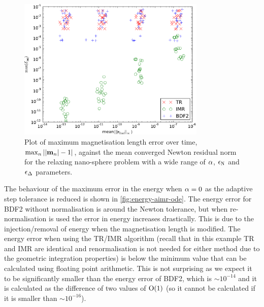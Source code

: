\begin{figure}
  \centering
  \includegraphics[width=0.8\textwidth]{plots/aimr_ode_llg_ml_sweep/maxofmlengtherrormaxesvsmeanminofnewtonresiduals.pdf}
  \caption{Plot of maximum magnetisation length error over time, $\max_n \left|{\left|{\boldsymbol{\mathrm{m}}_n} \right| -1} \right|$, against the mean converged Newton residual norm for the relaxing nano-sphere problem with a wide range of $\alpha$, $\epsilon_{\mathrm{N}}$ and $\epsilon_{\Delta_{}}$ parameters.}
  \label{fig:ml-aimr-newton}
\end{figure}

The behaviour of the maximum error in the energy when $\alpha = 0$ as the adaptive step tolerance is reduced is shown in \cref{fig:energy-aimr-ode}.
The energy error for BDF2 without normalisation is around the Newton tolerance, but when re-normalisation is used the error in energy increases drastically.
This is due to the injection/removal of energy when the magnetisation length is modified.
The energy error when using the TR/IMR algorithm (recall that in this example TR and IMR are identical and renormalisation is not needed for either method due to the geometric integration properties) is below the minimum value that can be calculated using floating point arithmetic.
This is not surprising as we expect it to be significantly smaller than the energy error of BDF2, which is $\sim 10^{-14}$ and it is calculated as the difference of two values of $\mathrm{O}{\left( 1 \right)}$ (so it cannot be calculated if it is smaller than $\sim 10^{-16}$).


